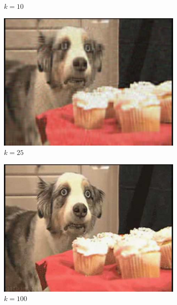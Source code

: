 \documentclass[11pt,a4paper]{article}
\begin{document}
\begin{figure}[H]
\begin{subfigure}[t]{.5\textwidth}
    \caption{$k = 10$}
  \end{subfigure}%
  \begin{subfigure}[t]{.5\textwidth}
    \centering
    \includegraphics[scale=0.3]{img/k25_me_in_nla}
    \caption{$k = 25$}
  \end{subfigure}
  \begin{subfigure}[t]{.5\textwidth}
    \centering
    \includegraphics[scale=0.3]{img/k100_me_in_nla}
    \caption{$k = 100$}
  \end{subfigure}%
  \begin{subfigure}[t]{.5\textwidth}
    \centering

\end{subfigure}
\end{figure}
\end{document}
